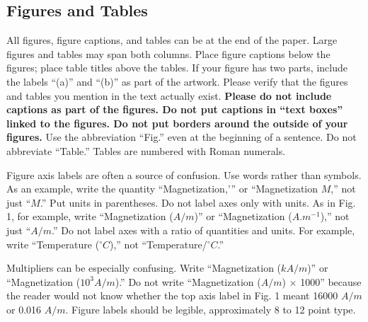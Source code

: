 \documentclass[journal,a4paper,onecolumn]{IEEEtran}
\begin{document}
%

\subsection{Figures and Tables}

All figures, figure captions, and tables can be at the end of the paper. Large figures and tables may span both columns. Place figure captions below the figures; place table titles above the tables. If your figure has two parts, include the labels ``(a)'' and ``(b)'' as part of the artwork. Please verify that the figures and tables you mention in the text actually exist. \textbf{Please do not include captions as part of the figures. Do not put captions in ``text boxes'' linked to the figures. Do not put borders around the outside of your figures.} Use the abbreviation ``Fig.'' even at the beginning of a sentence. Do not abbreviate ``Table.'' Tables are numbered with Roman numerals.

Figure axis labels are often a source of confusion. Use words rather than symbols. As an example, write the quantity ``Magnetization,'” or ``Magnetization $M$,'' not just ``$M$.'' Put units in parentheses. Do not label axes only with units. As in Fig. 1, for example, write ``Magnetization ($A/m$)'' or ``Magnetization ($A.m^{-1}$),'' not just ``$A/m$.'' Do not label axes with a ratio of quantities and units. For example, write ``Temperature ($^{\circ} C$),'' not ``Temperature/$^{\circ} C$.''

Multipliers can be especially confusing. Write ``Magnetization ($kA/m$)'' or ``Magnetization ($10^{3} A/m$).'' Do not write ``Magnetization ($A/m$) $\times$ 1000'' because the reader would not know whether the top axis label in Fig. 1 meant 16000 $A/m$ or 0.016 $A/m$. Figure labels should be legible, approximately 8 to 12 point type.
\end{document}
